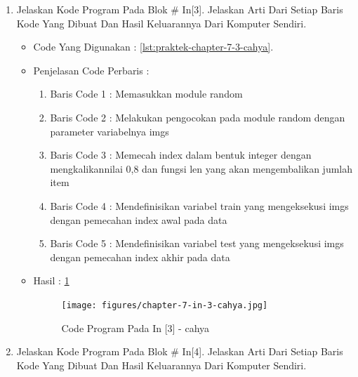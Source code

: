\begin{enumerate}
\begin{itemize}
\begin{figure}[!hbtp]
\end{figure}
\par
\par
\end{itemize}
\par
\par
\par
\item Jelaskan Kode Program Pada Blok \# In[3]. Jelaskan Arti Dari Setiap Baris Kode Yang Dibuat Dan Hasil Keluarannya Dari Komputer Sendiri.
\begin{itemize}
\item Code Yang Digunakan : \ref{lst:praktek-chapter-7-3-cahya}.

\par
\par
\item Penjelasan Code Perbaris	: 
\begin{enumerate}
\item Baris Code 1	: Memasukkan  module random
\item Baris Code 2	: Melakukan pengocokan pada module random dengan parameter variabelnya imgs
\item Baris Code 3	: Memecah index dalam bentuk integer dengan mengkalikannilai 0,8 dan fungsi len yang akan mengembalikan jumlah item
\item Baris Code 4	: Mendefinisikan variabel train yang mengeksekusi imgs dengan pemecahan index awal pada data
\item Baris Code 5	: Mendefinisikan variabel test yang mengeksekusi imgs dengan pemecahan index akhir pada data
\end{enumerate}
\par
\item Hasil : \ref{chapter-7-in-3-cahya}
\par
\par
\begin{figure}[!hbtp]
\centering
\texttt{[image: figures/chapter-7-in-3-cahya.jpg]}
\caption{Code Program Pada In [3] - cahya}
\label{chapter-7-in-3-cahya}
\end{figure}
\par
\par
\end{itemize}
\par
\par
\par
\item Jelaskan Kode Program Pada Blok \# In[4]. Jelaskan Arti Dari Setiap Baris Kode Yang Dibuat Dan Hasil Keluarannya Dari Komputer Sendiri.

\end{enumerate}
